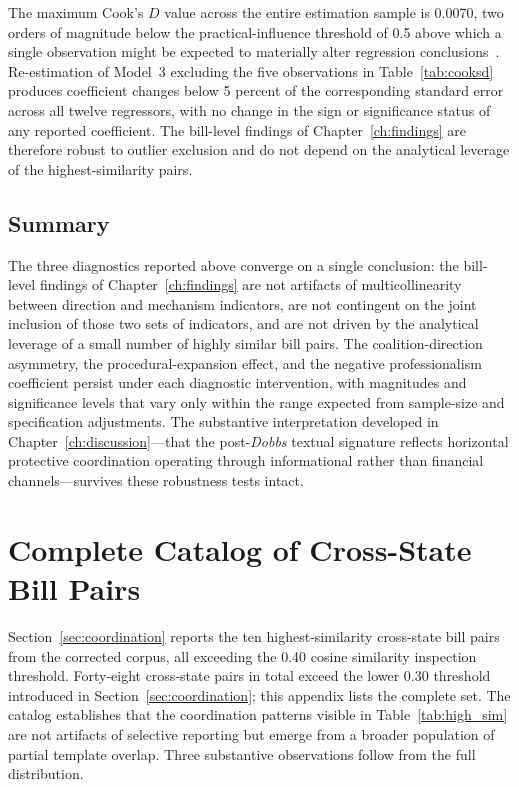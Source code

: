 \documentclass[12pt]{report}
\begin{document}
The maximum Cook's $D$ value across the entire estimation sample is 0.0070, two orders
of magnitude below the practical-influence threshold of 0.5 above which a single
observation might be expected to materially alter regression
conclusions~\parencite{cook1977}. Re-estimation of Model~3 excluding the five
observations in Table~\ref{tab:cooksd} produces coefficient changes below 5 percent of
the corresponding standard error across all twelve regressors, with no change in the
sign or significance status of any reported coefficient. The bill-level findings of
Chapter~\ref{ch:findings} are therefore robust to outlier exclusion and do not depend
on the analytical leverage of the highest-similarity pairs.

\section{Summary}
\label{app:C.4}

The three diagnostics reported above converge on a single conclusion: the bill-level
findings of Chapter~\ref{ch:findings} are not artifacts of multicollinearity between
direction and mechanism indicators, are not contingent on the joint inclusion of those
two sets of indicators, and are not driven by the analytical leverage of a small
number of highly similar bill pairs. The coalition-direction asymmetry, the
procedural-expansion effect, and the negative professionalism coefficient persist
under each diagnostic intervention, with magnitudes and significance levels that vary
only within the range expected from sample-size and specification adjustments. The
substantive interpretation developed in Chapter~\ref{ch:discussion}---that the
post-\emph{Dobbs} textual signature reflects horizontal protective coordination
operating through informational rather than financial channels---survives these
robustness tests intact.

\chapter{Complete Catalog of Cross-State Bill Pairs}
\label{app:D}

Section~\ref{sec:coordination} reports the ten highest-similarity cross-state bill pairs from
the corrected corpus, all exceeding the 0.40 cosine similarity inspection threshold.
Forty-eight cross-state pairs in total exceed the lower 0.30 threshold introduced in
Section~\ref{sec:coordination}; this appendix lists the complete set. The catalog establishes
that the coordination patterns visible in Table~\ref{tab:high_sim} are not
artifacts of selective reporting but emerge from a broader population of partial
template overlap. Three substantive observations follow from the full distribution.
\end{document}
